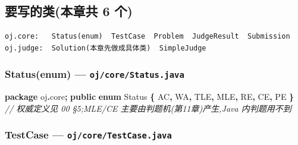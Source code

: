 \documentclass[
  11pt,
]{ctexart}
\newenvironment{Shaded}{\begin{snugshade}}{\end{snugshade}}
\newcommand{\CommentTok}[1]{\textcolor[rgb]{0.56,0.35,0.01}{\textit{#1}}}
\newcommand{\ImportTok}[1]{#1}
\newcommand{\KeywordTok}[1]{\textcolor[rgb]{0.13,0.29,0.53}{\textbf{#1}}}
\newcommand{\NormalTok}[1]{#1}
\newcommand{\OperatorTok}[1]{\textcolor[rgb]{0.81,0.36,0.00}{\textbf{#1}}}
\begin{document}
\hypertarget{ux8981ux5199ux7684ux7c7bux672cux7ae0ux5171-6-ux4e2a}{%
\subsection{要写的类(本章共 6
个)}\label{ux8981ux5199ux7684ux7c7bux672cux7ae0ux5171-6-ux4e2a}}

\begin{verbatim}
oj.core:   Status(enum)  TestCase  Problem  JudgeResult  Submission
oj.judge:  Solution(本章先做成具体类)  SimpleJudge
\end{verbatim}

\hypertarget{statusenum-ojcorestatus.java}{%
\subsubsection{\texorpdfstring{Status(enum) ---
\texttt{oj/core/Status.java}}{Status(enum) --- oj/core/Status.java}}\label{statusenum-ojcorestatus.java}}

\begin{Shaded}
\begin{Highlighting}[]
\KeywordTok{package}\ImportTok{ oj}\OperatorTok{.}\ImportTok{core}\OperatorTok{;}
\KeywordTok{public} \KeywordTok{enum}\NormalTok{ Status }\OperatorTok{\{}\NormalTok{ AC}\OperatorTok{,}\NormalTok{ WA}\OperatorTok{,}\NormalTok{ TLE}\OperatorTok{,}\NormalTok{ MLE}\OperatorTok{,}\NormalTok{ RE}\OperatorTok{,}\NormalTok{ CE}\OperatorTok{,}\NormalTok{ PE }\OperatorTok{\}}   \CommentTok{// 权威定义见 00 §5;MLE/CE 主要由判题机(第11章)产生,Java 内判题用不到}
\end{Highlighting}
\end{Shaded}

\hypertarget{testcase-ojcoretestcase.java}{%
\subsubsection{\texorpdfstring{TestCase ---
\texttt{oj/core/TestCase.java}}{TestCase --- oj/core/TestCase.java}}\label{testcase-ojcoretestcase.java}}
\end{document}
